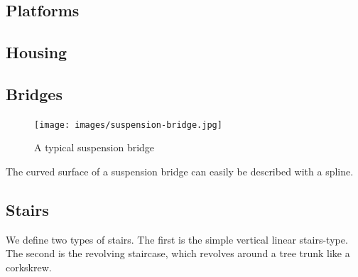  
\subsection{Platforms}
\label{sec:platform}
 


\subsection{Housing}
\label{sec:building}




\subsection{Bridges}
\label{sec:bridges}





\begin{figure}[ht]
\centering
\texttt{[image: images/suspension-bridge.jpg]}
\label{fig:bridgeExample}
\caption{A typical suspension bridge}
\end{figure}
The curved surface of a suspension bridge can easily be described with a spline.   

\subsection{Stairs}
\label{sec:stairs}
  
We define two types of stairs. The first is the simple vertical linear stairs-type. The second is the revolving staircase, which revolves around a tree trunk like a corkskrew. 


%

  